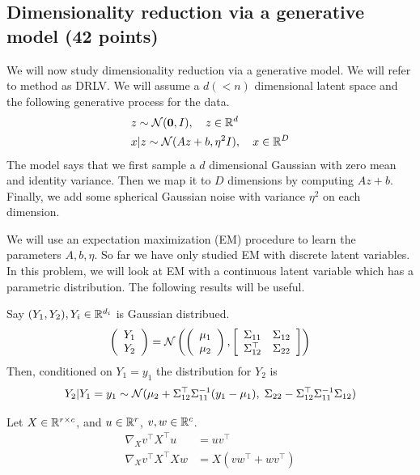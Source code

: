 \subsection{Dimensionality reduction via a generative model (42 points)}

We will now study dimensionality reduction via a generative model.
We will refer to method as DRLV.
We will assume a $d (<n)$ dimensional latent space and
the following generative process for the data.
\begin{align*}
& z \sim \mathcal{N}({\bf 0}, I),  \quad  z\in \mathbb{R}^d \\
& x|z \sim \mathcal{N}(Az + b, \eta^2 I),  \quad  x\in \mathbb{R}^D 
\end{align*}
The model says that we first sample a $d$ dimensional Gaussian with zero mean
and identity variance. Then we map it to $D$ dimensions by computing $Az+b$.
Finally, we add some spherical Gaussian noise with variance $\eta^2$ on each
dimension.

We will use an expectation maximization (EM)
procedure to learn the parameters $A, b, \eta$. So far we have only studied
 EM with discrete latent variables. In this problem, we will look at
EM with a continuous latent variable which has a parametric distribution.
The following results will be useful.\\

\begin{fact}
Say $(Y_1, Y_2), Y_i \in \mathbb{R}^{d_i}$ is Gaussian distribued.
\[
\left(\begin{array}{c}Y_1 \\ Y_2\end{array}\right) =
\mathcal{N} \left( \left(\begin{array}{c} \mu_1 \\ \mu_2 \end{array} \right), 
\left[ \begin{array}{cc} \Sigma_{11} & \Sigma_{12} \\ \Sigma_{12}^\top &
  \Sigma_{22} \end{array} \right] 
  \right)
\]
Then, conditioned on $Y_1 = y_1$ the distribution for $Y_2$ is
\[
Y_2 | Y_1 = y_1 \sim \mathcal{N}(\mu_2+ \Sigma_{12}^\top \Sigma_{11}^{-1} (y_1 - \mu_1), \;
  \Sigma_{22} - \Sigma_{12}^\top \Sigma_{11}^{-1}\Sigma_{12} )
\]
\end{fact}

\begin{fact}
Let $X\in \mathbb{R}^{r\times c}$, and $u\in \mathbb{R}^r$, $v,w \in \mathbb{R}^c$.
\begin{align*}
\nabla_X v^\top X^\top u &= uv^\top \\
\nabla_X v^\top X^\top X w &= X(vw^\top + wv^\top)
\end{align*}
\end{fact}
\vspace{0.1in}

